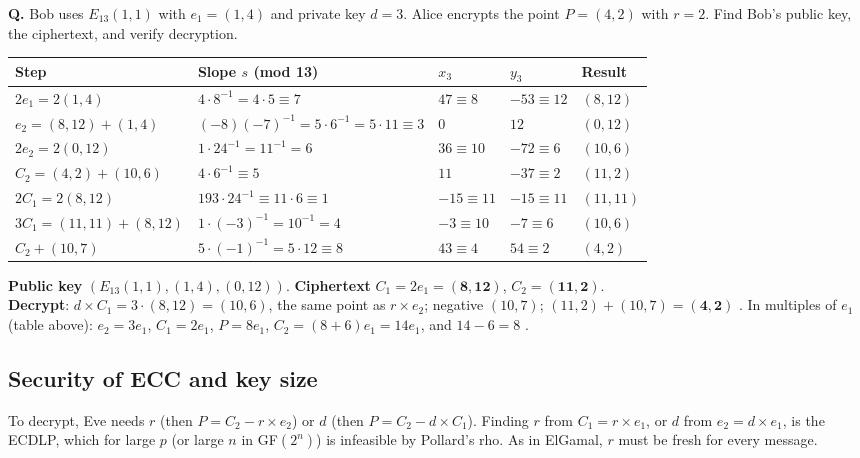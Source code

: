 \begin{worked}
\textbf{Q.} Bob uses $E_{13}(1, 1)$ with $e_1 = (1, 4)$ and private key $d = 3$. Alice encrypts the point $P = (4, 2)$ with $r = 2$. Find Bob's public key, the ciphertext, and verify decryption.

\begin{center}\small
\begin{tabular}{@{}lllll@{}}
\toprule
Step & Slope $s$ (mod 13) & $x_3$ & $y_3$ & Result\\
\midrule
$2e_1 = 2(1, 4)$ & $4 \cdot 8^{-1} = 4 \cdot 5 \equiv 7$ & $47 \equiv 8$ & $-53 \equiv 12$ & $(8, 12)$\\
$e_2 = (8, 12) + (1, 4)$ & $(-8)(-7)^{-1} = 5 \cdot 6^{-1} = 5 \cdot 11 \equiv 3$ & $0$ & $12$ & $(0, 12)$\\
$2e_2 = 2(0, 12)$ & $1 \cdot 24^{-1} = 11^{-1} = 6$ & $36 \equiv 10$ & $-72 \equiv 6$ & $(10, 6)$\\
$C_2 = (4, 2) + (10, 6)$ & $4 \cdot 6^{-1} \equiv 5$ & $11$ & $-37 \equiv 2$ & $(11, 2)$\\
$2C_1 = 2(8, 12)$ & $193 \cdot 24^{-1} \equiv 11 \cdot 6 \equiv 1$ & $-15 \equiv 11$ & $-15 \equiv 11$ & $(11, 11)$\\
$3C_1 = (11, 11) + (8, 12)$ & $1 \cdot (-3)^{-1} = 10^{-1} = 4$ & $-3 \equiv 10$ & $-7 \equiv 6$ & $(10, 6)$\\
$C_2 + (10, 7)$ & $5 \cdot (-1)^{-1} = 5 \cdot 12 \equiv 8$ & $43 \equiv 4$ & $54 \equiv 2$ & $(4, 2)$\\
\bottomrule
\end{tabular}
\end{center}
\textbf{Public key} $(E_{13}(1, 1), (1, 4), (0, 12))$. \textbf{Ciphertext} $C_1 = 2 e_1 = \mathbf{(8, 12)}$, $C_2 = \mathbf{(11, 2)}$.\\
\textbf{Decrypt}: $d \times C_1 = 3 \cdot (8, 12) = (10, 6)$, the same point as $r \times e_2$; negative $(10, 7)$; $(11, 2) + (10, 7) = \mathbf{(4, 2)}$ \checkmark. In multiples of $e_1$ (table above): $e_2 = 3e_1$, $C_1 = 2e_1$, $P = 8e_1$, $C_2 = (8 + 6)e_1 = 14 e_1$, and $14 - 6 = 8$ \checkmark.
\end{worked}

\subsection{Security of ECC and key size \hot}
To decrypt, Eve needs $r$ (then $P = C_2 - r \times e_2$) or $d$ (then $P = C_2 - d \times C_1$). Finding $r$ from $C_1 = r \times e_1$, or $d$ from $e_2 = d \times e_1$, is the ECDLP, which for large $p$ (or large $n$ in GF$(2^n)$) is infeasible by Pollard's rho. As in ElGamal, $r$ must be fresh for every message.

